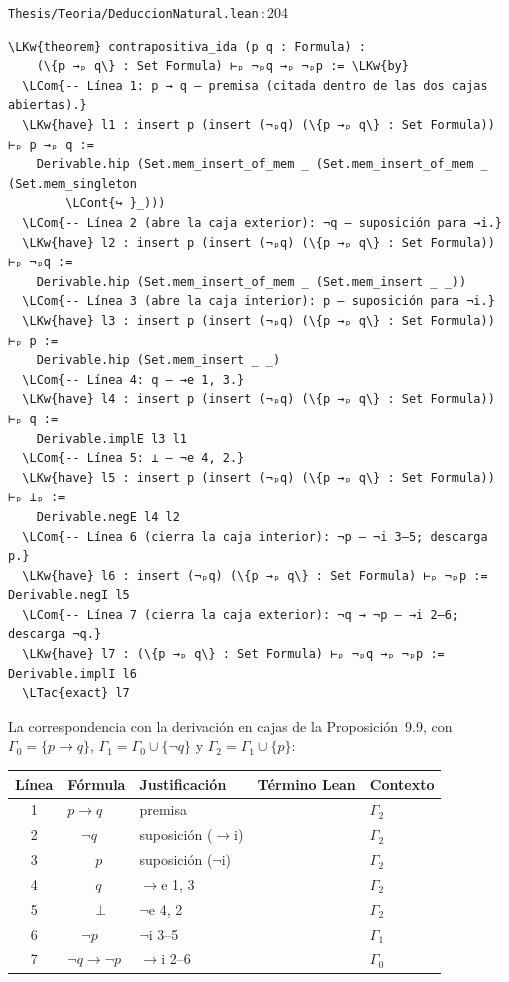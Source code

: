 \documentclass[11pt,a4paper]{article}
\newcommand{\LKw}[1]{\textcolor{kw}{\bfseries #1}}
\newcommand{\LTac}[1]{\textcolor{tac}{\bfseries #1}}
\newcommand{\LCom}[1]{\textcolor{com}{\itshape #1}}
\newcommand{\LCont}[1]{\textcolor{gray}{#1}}
\newcommand{\lean}[1]{\texttt{\directlua{leanbreak("\luaescapestring{\detokenize{#1}}")}}}
\newcommand{\ruta}[2]{\texttt{#1}\,:\,#2}
\begin{document}
\begin{codigolean}{\ruta{Thesis/Teoria/DeduccionNatural.lean}{204}}
\begin{Verbatim}[commandchars=\\\{\}]
\LKw{theorem} contrapositiva_ida (p q : Formula) :
    (\{p →ₚ q\} : Set Formula) ⊢ₚ ¬ₚq →ₚ ¬ₚp := \LKw{by}
  \LCom{-- Línea 1: p → q — premisa (citada dentro de las dos cajas abiertas).}
  \LKw{have} l1 : insert p (insert (¬ₚq) (\{p →ₚ q\} : Set Formula)) ⊢ₚ p →ₚ q :=
    Derivable.hip (Set.mem_insert_of_mem _ (Set.mem_insert_of_mem _ (Set.mem_singleton
        \LCont{↪ }_)))
  \LCom{-- Línea 2 (abre la caja exterior): ¬q — suposición para →i.}
  \LKw{have} l2 : insert p (insert (¬ₚq) (\{p →ₚ q\} : Set Formula)) ⊢ₚ ¬ₚq :=
    Derivable.hip (Set.mem_insert_of_mem _ (Set.mem_insert _ _))
  \LCom{-- Línea 3 (abre la caja interior): p — suposición para ¬i.}
  \LKw{have} l3 : insert p (insert (¬ₚq) (\{p →ₚ q\} : Set Formula)) ⊢ₚ p :=
    Derivable.hip (Set.mem_insert _ _)
  \LCom{-- Línea 4: q — →e 1, 3.}
  \LKw{have} l4 : insert p (insert (¬ₚq) (\{p →ₚ q\} : Set Formula)) ⊢ₚ q :=
    Derivable.implE l3 l1
  \LCom{-- Línea 5: ⊥ — ¬e 4, 2.}
  \LKw{have} l5 : insert p (insert (¬ₚq) (\{p →ₚ q\} : Set Formula)) ⊢ₚ ⊥ₚ :=
    Derivable.negE l4 l2
  \LCom{-- Línea 6 (cierra la caja interior): ¬p — ¬i 3–5; descarga p.}
  \LKw{have} l6 : insert (¬ₚq) (\{p →ₚ q\} : Set Formula) ⊢ₚ ¬ₚp := Derivable.negI l5
  \LCom{-- Línea 7 (cierra la caja exterior): ¬q → ¬p — →i 2–6; descarga ¬q.}
  \LKw{have} l7 : (\{p →ₚ q\} : Set Formula) ⊢ₚ ¬ₚq →ₚ ¬ₚp := Derivable.implI l6
  \LTac{exact} l7
\end{Verbatim}
\end{codigolean}

La correspondencia con la derivación en cajas de la Proposición~9.9, con
\(\Gamma_0 = \{p \to q\}\), \(\Gamma_1 = \Gamma_0 \cup \{\neg q\}\) y
\(\Gamma_2 = \Gamma_1 \cup \{p\}\):
\begin{center}
\small
\begin{tabular}{@{}cllll@{}}
\toprule
\textbf{Línea} & \textbf{Fórmula} & \textbf{Justificación} & \textbf{Término Lean} & \textbf{Contexto} \\
\midrule
1 & \(p \to q\) & premisa & \lean{hip (…of_mem (…of_mem (mem_singleton)))} & \(\Gamma_2\) \\
2 & \(\quad\neg q\) & suposición (\(\to\)i) & \lean{hip (mem_insert_of_mem _ (mem_insert _ _))} & \(\Gamma_2\) \\
3 & \(\qquad p\) & suposición (\(\neg\)i) & \lean{hip (mem_insert _ _)} & \(\Gamma_2\) \\
4 & \(\qquad q\) & \(\to\)e 1, 3 & \lean{implE l3 l1} & \(\Gamma_2\) \\
5 & \(\qquad \bot\) & \(\neg\)e 4, 2 & \lean{negE l4 l2} & \(\Gamma_2\) \\
6 & \(\quad\neg p\) & \(\neg\)i 3--5 & \lean{negI l5} & \(\Gamma_1\) \\
7 & \(\neg q \to \neg p\) & \(\to\)i 2--6 & \lean{implI l6} & \(\Gamma_0\) \\
\bottomrule
\end{tabular}
\end{center}
\end{document}
